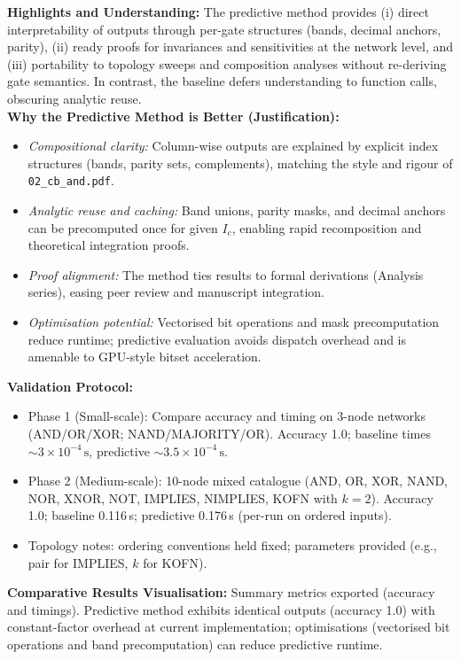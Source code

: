 \documentclass[11pt]{article}
\begin{document}
\textbf{Highlights and Understanding:} The predictive method provides (i) direct interpretability of outputs through per-gate structures (bands, decimal anchors, parity), (ii) ready proofs for invariances and sensitivities at the network level, and (iii) portability to topology sweeps and composition analyses without re-deriving gate semantics. In contrast, the baseline defers understanding to function calls, obscuring analytic reuse.\\
\textbf{Why the Predictive Method is Better (Justification):}
\begin{itemize}
 \item \emph{Compositional clarity:} Column-wise outputs are explained by explicit index structures (bands, parity sets, complements), matching the style and rigour of \texttt{02\_cb\_and.pdf}.
 \item \emph{Analytic reuse and caching:} Band unions, parity masks, and decimal anchors can be precomputed once for given \(I_c\), enabling rapid recomposition and theoretical integration proofs.
 \item \emph{Proof alignment:} The method ties results to formal derivations (Analysis series), easing peer review and manuscript integration.
 \item \emph{Optimisation potential:} Vectorised bit operations and mask precomputation reduce runtime; predictive evaluation avoids dispatch overhead and is amenable to GPU-style bitset acceleration.
\end{itemize}
\textbf{Validation Protocol:}
\begin{itemize}
 \item Phase 1 (Small-scale): Compare accuracy and timing on 3-node networks (AND/OR/XOR; NAND/MAJORITY/OR). Accuracy 1.0; baseline times \(\sim\!3\times10^{-4}\,\mathrm{s}\), predictive \(\sim\!3.5\times10^{-4}\,\mathrm{s}\).
 \item Phase 2 (Medium-scale): 10-node mixed catalogue (AND, OR, XOR, NAND, NOR, XNOR, NOT, IMPLIES, NIMPLIES, KOFN with \(k=2\)). Accuracy 1.0; baseline 0.116\,s; predictive 0.176\,s (per-run on ordered inputs).
 \item Topology notes: ordering conventions held fixed; parameters provided (e.g., pair for IMPLIES, \(k\) for KOFN).
\end{itemize}
\textbf{Comparative Results Visualisation:} Summary metrics exported (accuracy and timings). Predictive method exhibits identical outputs (accuracy 1.0) with constant-factor overhead at current implementation; optimisations (vectorised bit operations and band precomputation) can reduce predictive runtime.\\
\end{document}
